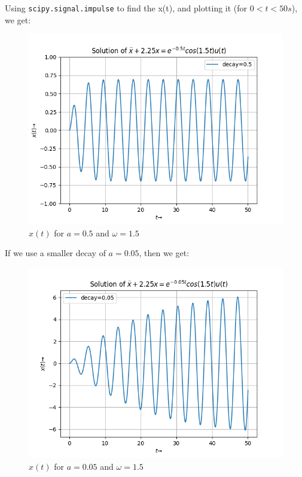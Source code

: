 \documentclass[11pt, a4paper, twoside]{article}
\begin{document}
        Using \texttt{scipy.signal.impulse} to find the x(t), and plotting it (for $0<t<50 s$), we get:
        \begin{figure}[H]
            \centering
            \includegraphics[scale=0.7]{Fig 1.png}
            \caption{$x(t)$ for $a=0.5$ and $\omega=1.5$}
            \label{fig:Fig1}
        \end{figure}
        
        If we use a smaller decay of $a=0.05$, then we get:
        \begin{figure}[H]
            \centering
            \includegraphics[scale=0.7]{Fig 2.png}
            \caption{$x(t)$ for $a=0.05$ and $\omega=1.5$}
            \label{fig:Fig2}
        \end{figure}
        
\end{document}
